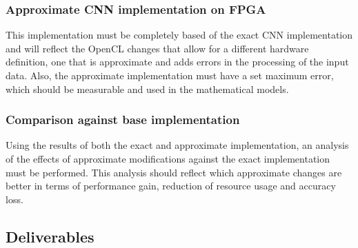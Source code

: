 \subsubsection{Approximate CNN implementation on FPGA}

This implementation must be completely based of the exact CNN implementation and will 
reflect the OpenCL changes that allow for a different hardware definition, one that is 
approximate and adds errors in the processing of the input data. Also, the approximate
implementation must have a set maximum error, which should be measurable and used
in the mathematical models.

\subsubsection{Comparison against base implementation}

Using the results of both the exact and approximate implementation, an analysis of
the effects of approximate modifications against the exact implementation must be performed.
This analysis should reflect which approximate changes are better in terms of performance gain,
reduction of resource usage and accuracy loss.

\subsection{Deliverables}

